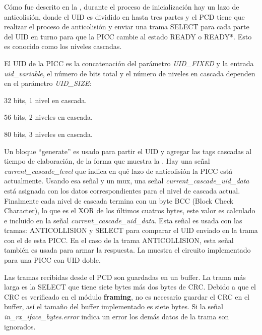 \documentclass[a4paper, twoside, 11pt]{report}
\begin{document}
Cómo fue descrito en la , durante el proceso de inicialización hay un lazo de anticolisión, donde el UID es dividido en hasta tres partes y el PCD tiene que realizar el proceso de anticolisión y enviar una trama SELECT para cada parte del UID en turno para que la PICC cambie al estado READY o READY*. Esto es conocido como los niveles cascadas.

El UID de la PICC es la concatenación del parámetro \textit{UID\_FIXED} y la entrada \textit{uid\_var\-iable}, el número de bits total y el número de niveles en cascada dependen en el parámetro \textit{UID\_SIZE}:

\begin{description}[labelwidth=3.8cm]
    \item [UIDSize\_SINGLE:] 32 bits, 1 nivel en cascada.
    \item [UIDSize\_DOUBLE:] 56 bits, 2 niveles en cascada.
    \item [UIDSize\_TRIPLE:] 80 bits, 3 niveles en cascada.
\end{description}

Un bloque “generate” es usado para partir el UID y agregar las tags cascadas al tiempo de elaboración, de la forma que muestra la . Hay una señal \textit{current\_cascade\_level} que indica en qué lazo de anticolisión la PICC está actualmente. Usando esa señal y un mux, una señal \textit{current\_cascade\_uid\_data} está asignada con los datos correspondientes para el nivel de cascada actual. Finalmente cada nivel de cascada termina con un byte BCC (Block Check Character), lo que es el XOR de los últimos cuatros bytes, este valor es calculado e incluido en la señal \textit{current\_cascade\_uid\_data}. Esta señal es usada con las tramas: ANTICOLLISION y SELECT para comparar el UID enviado en la trama con el de esta PICC. En el caso de la trama ANTICOLLISION, esta señal también es usada para armar la respuesta. La  muestra el circuito implementado para una PICC con UID doble.

Las tramas recibidas desde el PCD son guardadas en un buffer. La trama más larga es la SELECT que tiene siete bytes más dos bytes de CRC. Debido a que el CRC es verificado en el módulo \textbf{framing}, no es necesario guardar el CRC en el buffer, así el tamaño del buffer implementado es siete bytes. Si la señal \textit{in\_rx\_iface\_bytes.error} indica un error los demás datos de la trama son ignorados.
\end{document}
